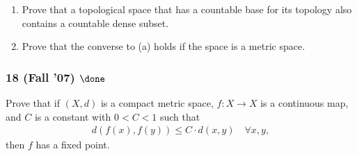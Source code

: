 \begin{problem}[?]

\begin{enumerate}
\def\labelenumi{\alph{enumi}.}
\item
  Prove that a topological space that has a countable base for its
  topology also contains a countable dense subset.
\item
  Prove that the converse to (a) holds if the space is a metric space.
\end{enumerate}

\end{problem}

\hypertarget{fall-07-done}{%
\subsubsection{\texorpdfstring{18 (Fall '07)
\(\done\)}{18 (Fall '07) \textbackslash done}}\label{fall-07-done}}

\begin{problem}[?]

Prove that if \((X, d)\) is a compact metric space, \(f : X \to X\) is a
continuous map, and \(C\) is a constant with \(0 < C < 1\) such that
\begin{align*}
d(f (x), f (y)) \leq C \cdot d(x, y) \quad \forall x, y
,\end{align*}
then \(f\) has a fixed point.

\end{problem}

